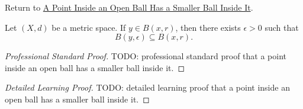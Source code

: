 \newpage
{}
\label{prf:fv-msml-ball-subset-ball-of-mem}

\begin{remark*}[Return]
Return to \hyperref[thm:fv-msml-ball-subset-ball-of-mem]{A Point Inside an Open Ball Has a Smaller Ball Inside It}.
\end{remark*}

\begin{theorem*}
Let $(X,d)$ be a metric space. If \(y\in B(x,r)\), then there exists
\(\epsilon>0\) such that
\[
  B(y,\epsilon)\subseteq B(x,r).
\]
\end{theorem*}

\begin{proof}[Professional Standard Proof]
\LRAProofBodyStart
TODO: professional standard proof that a point inside an open ball has a smaller ball inside it.
\end{proof}

\begin{proof}[Detailed Learning Proof]
\LRAProofBodyStart
TODO: detailed learning proof that a point inside an open ball has a smaller ball inside it.
\end{proof}

\begin{remark*}
\end{remark*}

\NoLocalDependencies

\clearpage

